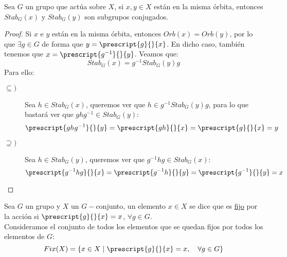 \begin{prop}
    Sea $G$ un grupo que actúa sobre $X$, si $x,y\in X$ están en la misma órbita, entonces $Stab_G(x)$ y $Stab_G(y)$ son subgrupos conjugados.
    \begin{proof}
        Si $x$ e $y$ están en la misma órbita, entonces $Orb(x) = Orb(y)$, por lo que $\exists g\in G$ de forma que $y = \prescript{g}{}{x}$. En dicho caso, también tenemos que $x = \prescript{g^{-1}}{}{y}$. Veamos que:
        \begin{equation*}
            Stab_G(x) = g^{-1}Stab_G(y)g
        \end{equation*}
        Para ello:
        \begin{description}
            \item[$\subseteq)$] Sea $h\in Stab_G(x)$, queremos ver que $h\in g^{-1}Stab_G(y)g$, para lo que bastará ver que $ghg^{-1}\in Stab_G(y)$:
                \begin{equation*}
                    \prescript{ghg^{-1}}{}{y} = \prescript{gh}{}{x} = \prescript{g}{}{x} = y
                \end{equation*}
            \item[$\supseteq)$] Sea $h\in Stab_G(y)$, queremos ver que $g^{-1}hg\in Stab_G(x)$:
                \begin{equation*}
                    \prescript{g^{-1}hg}{}{x} = \prescript{g^{-1}h}{}{y} = \prescript{g^{-1}}{}{y} = x
                \end{equation*}
        \end{description}
    \end{proof}
\end{prop}

\begin{definicion}
    Sea $G$ un grupo y $X$ un $G-$conjunto, un elemento $x\in X$ se dice que es \underline{fijo} por la acción si $\prescript{g}{}{x} = x$, $\forall g\in G$.\\

    \noindent
    Consideramos el conjunto de todos los elementos que se quedan fijos por todos los elementos de $G$:
    \begin{equation*}
        Fix(X) = \{x\in X \mid \prescript{g}{}{x} = x, \quad \forall g\in G\}
    \end{equation*}
\end{definicion}

